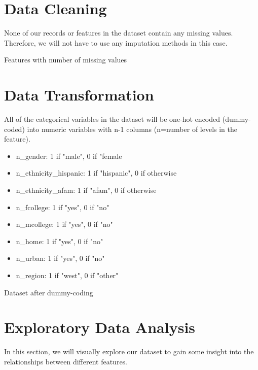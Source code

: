 \documentclass[12pt]{article}
\begin{document}
\section{Data Cleaning}
None of our records or features in the dataset contain any missing values. Therefore, we will not have to use any imputation methods in this case.
\begin{table}[h]
    \centering
    
    
    \caption{Features with number of missing values}
    \label{tab:missing}
\end{table}

\newpage
\section{Data Transformation}
All of the categorical variables in the dataset will be one-hot encoded (dummy-coded) into numeric variables with n-1 columns (n=number of levels in the feature).
\begin{itemize}
    \item n\_gender: 1 if "male", 0 if "female
    \item n\_ethnicity\_hispanic: 1 if "hispanic", 0 if otherwise
    \item n\_ethnicity\_afam: 1 if "afam", 0 if otherwise
    \item n\_fcollege: 1 if "yes", 0 if "no"
    \item n\_mcollege: 1 if "yes", 0 if "no"
    \item n\_home: 1 if "yes", 0 if "no"
    \item n\_urban: 1 if "yes", 0 if "no"
    \item n\_region: 1 if "west", 0 if "other"
\end{itemize}

\begin{table}[h]
    \centering
    \resizebox{1.1\textwidth}{!}{%
     }
    \caption{Dataset after dummy-coding}
    \label{tab:transformed_data}
\end{table}

\section{Exploratory Data Analysis}
In this section, we will visually explore our dataset to gain some insight into the relationships between different features.
\end{document}
